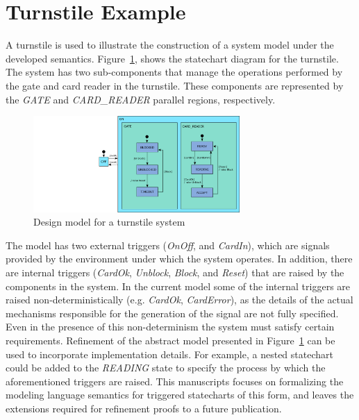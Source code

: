 \section{Turnstile Example}
\label{sec:example}

A turnstile is used to illustrate the construction of a system model under the developed semantics. 
Figure~\ref{fig:turnstile}, shows the statechart diagram for the turnstile. The system has two sub-components that manage the operations performed by the gate and card reader in the turnstile. These components are represented by the \emph{GATE} and \emph{CARD\_READER} parallel regions, respectively. 
\begin{figure}[!th]
\centering
\includegraphics[trim={25cm 0 0 0}, width=0.7\textwidth]{figures/Turnstile.png}
\caption{Design model for a turnstile system}
\label{fig:turnstile}
\end{figure}

The model has two external triggers (\emph{OnOff}, and \emph{CardIn}), which are signals provided by the environment under which the system operates. In addition, there are internal triggers (\emph{CardOk}, \emph{Unblock}, \emph{Block}, and \emph{Reset}) that are raised by the components in the system. In the current model some of the internal triggers are raised non-deterministically (e.g. \emph{CardOk}, \emph{CardError}), as the details of the actual mechanisms responsible for the generation of the signal are not fully specified. Even in the presence of this non-determinism the system must satisfy certain requirements. 
Refinement of the abstract model presented in Figure~\ref{fig:turnstile} can be used to incorporate implementation details. 
For example, a nested  statechart could be added to the \emph{READING} state to specify the process by which the aforementioned triggers are  raised. 
This manuscripts focuses on formalizing the modeling language semantics for triggered statecharts of this form, and leaves the extensions required for refinement proofs to a future publication.  
